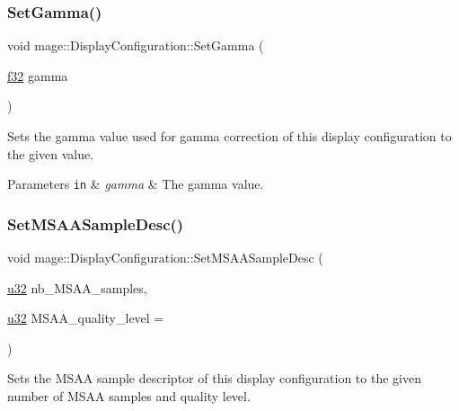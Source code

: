 \subsubsection{\texorpdfstring{Set\+Gamma()}{SetGamma()}}
{\footnotesize\ttfamily void mage\+::\+Display\+Configuration\+::\+Set\+Gamma (\begin{DoxyParamCaption}\item[{\hyperlink{namespacemage_a6a44ad388483959dc4dff9f2aef91431}{f32}}]{gamma }\end{DoxyParamCaption})\hspace{0.3cm}{\ttfamily [noexcept]}}

Sets the gamma value used for gamma correction of this display configuration to the given value.


\begin{DoxyParams}[1]{Parameters}
\mbox{\tt in}  & {\em gamma} & The gamma value. \\
\hline
\end{DoxyParams}
\hypertarget{structmage_1_1_display_configuration_afaed7124e8d0a2e2ffdb3236b78d6753}{}\label{structmage_1_1_display_configuration_afaed7124e8d0a2e2ffdb3236b78d6753} 
\subsubsection{\texorpdfstring{Set\+M\+S\+A\+A\+Sample\+Desc()}{SetMSAASampleDesc()}\hspace{0.1cm}{\footnotesize\ttfamily [1/2]}}
{\footnotesize\ttfamily void mage\+::\+Display\+Configuration\+::\+Set\+M\+S\+A\+A\+Sample\+Desc (\begin{DoxyParamCaption}\item[{\hyperlink{namespacemage_af2b398bf98eb10351f49cad73fe2cc73}{u32}}]{nb\+\_\+\+M\+S\+A\+A\+\_\+samples,  }\item[{\hyperlink{namespacemage_af2b398bf98eb10351f49cad73fe2cc73}{u32}}]{M\+S\+A\+A\+\_\+quality\+\_\+level = {} }\end{DoxyParamCaption})\hspace{0.3cm}{\ttfamily [noexcept]}}

Sets the M\+S\+AA sample descriptor of this display configuration to the given number of M\+S\+AA samples and quality level.


